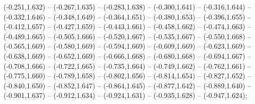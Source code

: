 (-0.251,1.632) -- (-0.267,1.635) -- (-0.283,1.638) -- (-0.300,1.641) -- (-0.316,1.644) -- (-0.332,1.646) -- (-0.348,1.649) -- (-0.364,1.651) -- (-0.380,1.653) -- (-0.396,1.655) -- (-0.412,1.657) -- (-0.427,1.659) -- (-0.443,1.661) -- (-0.458,1.662) -- (-0.474,1.663) -- (-0.489,1.665) -- (-0.505,1.666) -- (-0.520,1.667) -- (-0.535,1.667) -- (-0.550,1.668) -- (-0.565,1.669) -- (-0.580,1.669) -- (-0.594,1.669) -- (-0.609,1.669) -- (-0.623,1.669) -- (-0.638,1.669) -- (-0.652,1.669) -- (-0.666,1.668) -- (-0.680,1.668) -- (-0.694,1.667) -- (-0.708,1.666) -- (-0.722,1.665) -- (-0.735,1.664) -- (-0.749,1.662) -- (-0.762,1.661) -- (-0.775,1.660) -- (-0.789,1.658) -- (-0.802,1.656) -- (-0.814,1.654) -- (-0.827,1.652) -- (-0.840,1.650) -- (-0.852,1.647) -- (-0.864,1.645) -- (-0.877,1.642) -- (-0.889,1.640) -- (-0.901,1.637) -- (-0.912,1.634) -- (-0.924,1.631) -- (-0.935,1.628) -- (-0.947,1.624);

